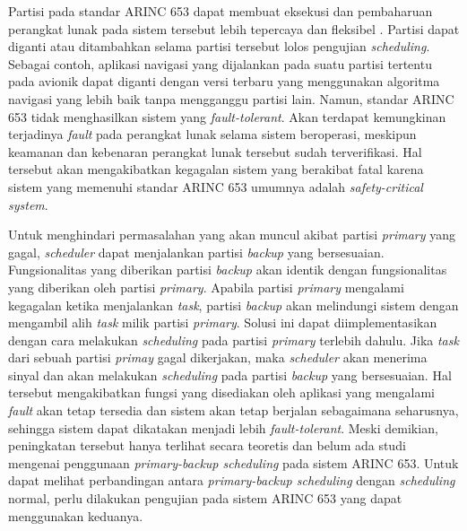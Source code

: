 Partisi pada standar ARINC 653 dapat membuat eksekusi dan pembaharuan perangkat lunak pada sistem tersebut lebih tepercaya dan fleksibel \citep{Jin2013}.
Partisi dapat diganti atau ditambahkan selama partisi tersebut lolos pengujian \textit{scheduling}.
Sebagai contoh, aplikasi navigasi yang dijalankan pada suatu partisi tertentu pada avionik dapat diganti dengan versi terbaru yang menggunakan algoritma navigasi yang lebih baik tanpa mengganggu partisi lain.
Namun, standar ARINC 653 tidak menghasilkan sistem yang \textit{fault-tolerant}.
Akan terdapat kemungkinan terjadinya \textit{fault} pada perangkat lunak selama sistem beroperasi, meskipun keamanan dan kebenaran perangkat lunak tersebut sudah terverifikasi.
Hal tersebut akan mengakibatkan kegagalan sistem yang berakibat fatal karena sistem yang memenuhi standar ARINC 653 umumnya adalah \textit{safety-critical system}.

Untuk menghindari permasalahan yang akan muncul akibat partisi \textit{primary} yang gagal, \textit{scheduler} dapat menjalankan partisi \textit{backup} yang bersesuaian.
Fungsionalitas yang diberikan partisi \textit{backup} akan identik dengan fungsionalitas yang diberikan oleh partisi \textit{primary}.
Apabila partisi \textit{primary} mengalami kegagalan ketika menjalankan \textit{task}, partisi \textit{backup} akan melindungi sistem dengan mengambil alih \textit{task} milik partisi \textit{primary}.
Solusi ini dapat diimplementasikan dengan cara melakukan \textit{scheduling} pada partisi \textit{primary} terlebih dahulu.
Jika \textit{task} dari sebuah partisi \textit{primay} gagal dikerjakan, maka \textit{scheduler} akan menerima sinyal dan akan melakukan \textit{scheduling} pada partisi \textit{backup} yang bersesuaian.
Hal tersebut mengakibatkan fungsi yang disediakan oleh aplikasi yang mengalami \textit{fault} akan tetap tersedia dan sistem akan tetap berjalan sebagaimana seharusnya, sehingga sistem dapat dikatakan menjadi lebih \textit{fault-tolerant}.
Meski demikian, peningkatan tersebut hanya terlihat secara teoretis dan belum ada studi mengenai penggunaan \textit{primary-backup scheduling} pada sistem ARINC 653.
Untuk dapat melihat perbandingan antara \textit{primary-backup scheduling} dengan \textit{scheduling} normal, perlu dilakukan pengujian pada sistem ARINC 653 yang dapat menggunakan keduanya.


